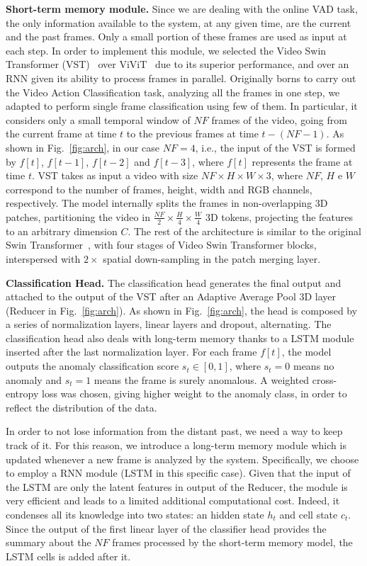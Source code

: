 \noindent\textbf{Short-term memory module.}
Since we are dealing with the online VAD task, the only information available to the system, at any given time, are the current and the past frames.
Only a small portion of these frames are used as input at each step.
In order to implement this module, we selected the Video Swin Transformer (VST)~\cite{liu_video_2022} over ViViT~\cite{Arnab_2021_ICCV} due to its superior performance, and over an RNN given its ability to process frames in parallel.
Originally borns to carry out the Video Action Classification task, analyzing all the frames in one step, we adapted to perform single frame classification using few of them.
In particular, it considers only a small temporal window of $\mathit{NF}$ frames of the video, going from the current frame at time $t$ to the previous frames at time $t-\left(\mathit{NF}-1\right)$.
As shown in Fig.~\ref{fig:arch}, in our case $\mathit{NF}=4$, i.e., the input of the VST is formed by $f[t]$, $f[t-1]$, $f[t-2]$ and $f[t-3]$, where $f[t]$ represents the frame at time $t$.
VST takes as input a video with size $\mathit{NF} \times H \times W \times 3$, where $\mathit{NF}$, $H$ e $W$ correspond to the number of frames, height, width and RGB channels, respectively.
The model internally splits the frames in non-overlapping 3D patches, partitioning the video in $\frac{\mathit{NF}}{2} \times \frac{H}{4} \times \frac{W}{4}$ 3D tokens, projecting the features to an arbitrary dimension $C$.
The rest of the architecture is similar to the original Swin Transformer~\cite{liu2021Swin}, with four stages of Video Swin Transformer blocks, interspersed with $2\times$ spatial down-sampling in the patch merging layer.

\noindent\textbf{Classification Head.}
The classification head generates the final output and  attached to the output of the VST after an Adaptive Average Pool 3D layer (Reducer in Fig.~\ref{fig:arch}).
As shown in Fig.~\ref{fig:arch}, the head is composed by a series of normalization layers, linear layers and dropout, alternating. 
The classification head also deals with long-term memory thanks to a LSTM module inserted after the last normalization layer.
For each frame $f[t]$, the model outputs the anomaly classification score $s_t \in [0,1]$, where $s_t=0$ means no anomaly and $s_t=1$ means the frame is surely anomalous.
A weighted cross-entropy loss was chosen, giving higher weight to the anomaly class, in order to reflect the distribution of the data.

In order to not lose information from the distant past, we need a way to keep track of it.
For this reason, we introduce a long-term memory module  which is updated whenever a new frame is analyzed by the system.
Specifically, we choose to employ a RNN module (LSTM \cite{lstm} in this specific case).
Given that the input of the LSTM  are only the latent features in output of the Reducer, the module is very efficient and leads to a limited additional computational cost.
Indeed, it condenses all its knowledge into two states: an hidden state $h_t$ and cell state $c_t$.
Since the output of the first linear layer of the classifier head provides the summary about the $\mathit{NF}$ frames processed by the short-term memory model, the LSTM cells is added after it.


